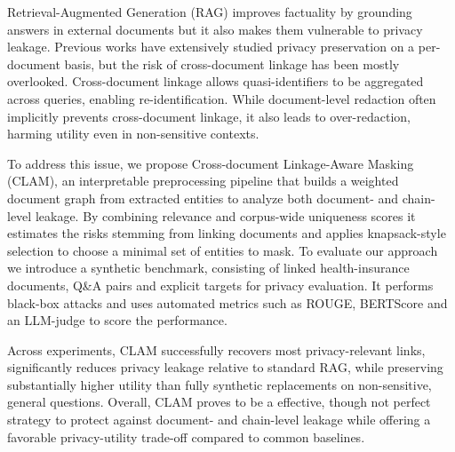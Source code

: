 
Retrieval-Augmented Generation (RAG) improves factuality by grounding answers in
external documents but it also makes them vulnerable to privacy leakage. Previous
works have extensively studied privacy preservation on a per-document basis, but the
risk of cross-document linkage has been mostly overlooked. Cross-document linkage
allows quasi-identifiers to be aggregated across queries, enabling re-identification.
While document-level redaction often implicitly prevents cross-document linkage, it
also leads to over-redaction, harming utility even in non-sensitive contexts.

To address this issue, we propose Cross-document Linkage-Aware Masking (CLAM),
an interpretable preprocessing pipeline that builds a weighted document graph from
extracted entities to analyze both document- and chain-level leakage. By combining
relevance and corpus-wide uniqueness scores it estimates the risks stemming from
linking documents and applies knapsack-style selection to choose a minimal set of
entities to mask. To evaluate our approach we introduce a synthetic benchmark,
consisting of linked health-insurance documents, Q\&A pairs and explicit targets for
privacy evaluation. It performs black-box attacks and uses automated metrics such as
ROUGE, BERTScore and an LLM-judge to score the performance.

Across experiments, CLAM successfully recovers most privacy-relevant links, significantly reduces privacy leakage relative to standard RAG, while preserving substantially
higher utility than fully synthetic replacements on non-sensitive, general questions.
Overall, CLAM proves to be a effective, though not perfect strategy to protect against
document- and chain-level leakage while offering a favorable privacy-utility trade-off
compared to common baselines.